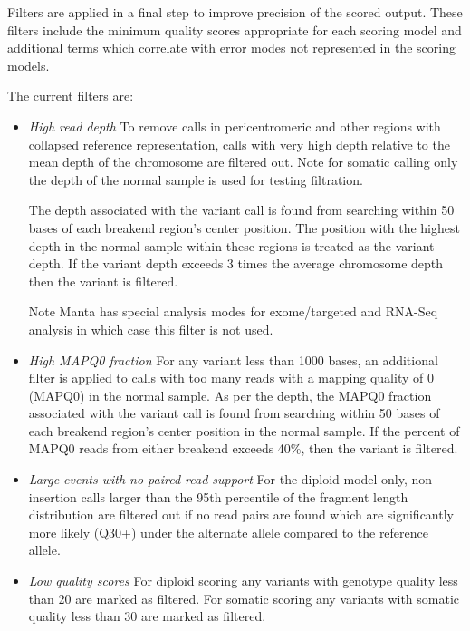 \documentclass{article}
\begin{document}
Filters are applied in a final step to improve precision of the scored output. These filters include the minimum quality scores appropriate for each scoring model and additional terms which correlate with error modes not represented in the scoring models.

The current filters are:

\begin{itemize} 

\item \textit{High read depth} To remove calls in pericentromeric and other regions with collapsed reference representation, calls with very high depth relative to the mean depth of the chromosome are filtered out. Note for somatic calling only the depth of the normal sample is used for testing filtration.

The depth associated with the variant call is found from searching within 50 bases of each breakend region's center position. The position with the highest depth in the normal sample within these regions is treated as the variant depth. If the variant depth exceeds 3 times the average chromosome depth then the variant is filtered.

Note Manta has special analysis modes for exome/targeted and RNA-Seq analysis in which case this filter is not used.

\item \textit{High MAPQ0 fraction} For any variant less than 1000 bases, an additional filter is applied to calls with too many reads with a mapping quality of 0 (MAPQ0) in the normal sample. As per the depth, the MAPQ0 fraction associated with the variant call is found from searching within 50 bases of each breakend region's center position in the normal sample. If the percent of MAPQ0 reads from either breakend exceeds 40\%, then the variant is filtered.

\item \textit{Large events with no paired read support} For the diploid model only, non-insertion calls larger than the 95th percentile of the fragment length distribution are filtered out if no read pairs are found which are significantly more likely (Q30+) under the alternate allele compared to the reference allele.

\item \textit{Low quality scores} For diploid scoring any variants with genotype quality less than 20 are marked as filtered. For somatic scoring any variants with somatic quality less than 30 are marked as filtered.

\end{itemize}




\end{document}
